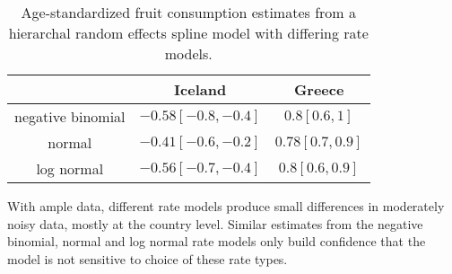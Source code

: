     \begin{table}[h]
        \begin{center}
        \begin{tabular}{|c|c|c|}
            \hline
                & Iceland & Greece \\
            \hline
                negative binomial & $-0.58 [-0.8, -0.4]$ & $0.8 [0.6, 1]$ \\
                normal & $-0.41 [-0.6, -0.2]$ & $0.78 [0.7, 0.9]$ \\
                log normal & $-0.56 [-0.7, -0.4]$ & $0.8 [0.6, 0.9]$ \\
            \hline
        \end{tabular}
        \end{center}
        \caption{ Age-standardized fruit consumption estimates
          from a hierarchal random effects spline model with differing
          rate models.}
        \label{tab:app-fruit rfx}
    \end{table}

With ample data, different rate models produce small differences in 
moderately noisy data, mostly at the country level.  Similar estimates 
from the negative binomial, normal and log normal rate models only 
build confidence that the model is not sensitive to choice of these 
rate types. 